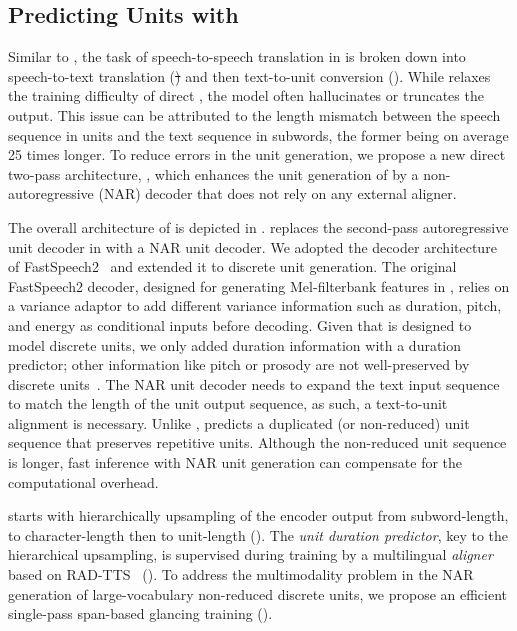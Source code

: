 \subsection{Predicting Units with \unitytwo}\label{sec:offline:unity2}
Similar to \mfourt, the task of speech-to-speech translation in \mfourttwo is broken down into speech-to-text translation (\st) and then text-to-unit conversion (\tu).
While \unity relaxes the training difficulty of direct \sst, the \tu model often hallucinates or truncates the output.
This issue can be attributed to the length mismatch between the speech sequence in units and the text sequence in subwords, the former being on average 25 times longer.
To reduce errors in the unit generation, we propose a new direct two-pass {\sst} architecture, {\unitytwo}, which enhances the unit generation of {\unity} by a non-autoregressive (NAR) decoder that does not rely on any external aligner.

The overall architecture of \unitytwo is depicted in .
\unitytwo replaces the second-pass autoregressive unit decoder in \unity with a NAR unit decoder.
We adopted the decoder architecture of FastSpeech2~\citep{ren2021fastspeech} and extended it to discrete unit generation.
The original FastSpeech2 decoder, designed for generating Mel-filterbank features in \tts, relies on a variance adaptor to add different variance information such as duration, pitch, and energy as conditional inputs before decoding.
Given that \unitytwo is designed to model discrete units, we only added duration information with a duration predictor; 
other information like pitch or prosody are not well-preserved by discrete units~\citep{polyak21_interspeech}.
The NAR unit decoder needs to expand the text input sequence to match the length of the unit output sequence, as such, a text-to-unit 
alignment is necessary.
Unlike \unity, \unitytwo predicts a duplicated (or non-reduced) unit sequence that preserves repetitive units.
Although the non-reduced unit sequence is longer, fast inference with NAR unit generation can compensate for the computational overhead.

\unitytwo starts with hierarchically upsampling of the \tu encoder output from subword-length, to character-length then to unit-length ().
The \textit{unit duration predictor}, key to the hierarchical upsampling, is supervised during training by a multilingual \textit{aligner} based on RAD-TTS~\citep{shih2021rad} ().
To address the multimodality problem in the NAR generation of large-vocabulary non-reduced discrete units, we propose an efficient single-pass span-based glancing training ().




